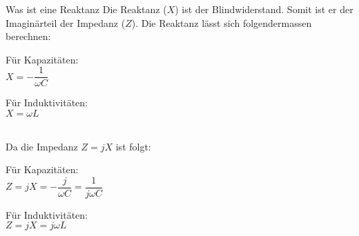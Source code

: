 
\begin{karte}{Was ist eine Reaktanz}
	Die Reaktanz ($X$) ist der Blindwiderstand. Somit ist er der Imaginärteil der Impedanz ($Z$). 
	Die Reaktanz lässt sich folgendermassen berechnen:\\[10pt]
	\begin{minipage}[t]{0.48\textwidth}
		Für Kapazitäten:\\
		$X = - \dfrac{1}{\omega C}$
	\end{minipage}
	\begin{minipage}[t]{0.48\textwidth}
		Für Induktivitäten:\\
		$X = \omega L$
	\end{minipage}\\[10pt]
	Da die Impedanz $Z = jX$ ist folgt:\\[10pt]
	\begin{minipage}[t]{0.48\textwidth}
		Für Kapazitäten:\\
		$Z = jX = - \dfrac{j}{\omega C} = \dfrac{1}{j \omega C}$
	\end{minipage}
	\begin{minipage}[t]{0.48\textwidth}
		Für Induktivitäten:\\
		$Z = jX = j \omega L$
	\end{minipage}
\end{karte}
